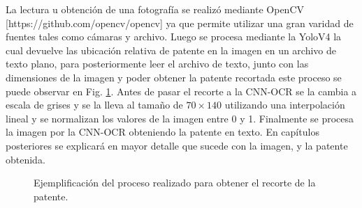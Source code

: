 La lectura u obtención de una fotografía se realizó mediante OpenCV [https://github.com/opencv/opencv] ya que permite utilizar una gran varidad de fuentes tales como cámaras y archivo. Luego se procesa mediante la YoloV4 la cual devuelve las ubicación relativa de patente en la imagen en un archivo de texto plano, para posteriormente leer el archivo de texto, junto con las dimensiones de la imagen y poder obtener la patente recortada este proceso se puede observar en Fig. \ref{fig:yolo-car-to-plate}. Antes de pasar el recorte a la CNN-OCR se la cambia a escala de grises y se la lleva al tamaño de $70 \times 140$ utilizando una interpolación lineal y se normalizan los valores de la imagen entre 0 y 1. Finalmente se procesa la imagen por la CNN-OCR obteniendo la patente en texto. En capítulos posteriores se explicará en mayor detalle que sucede con la imagen, y la patente obtenida.

\begin{figure}
    \centering

    \caption{Ejemplificación del proceso realizado para obtener el recorte de la patente.}
    \label{fig:yolo-car-to-plate}
\end{figure}







